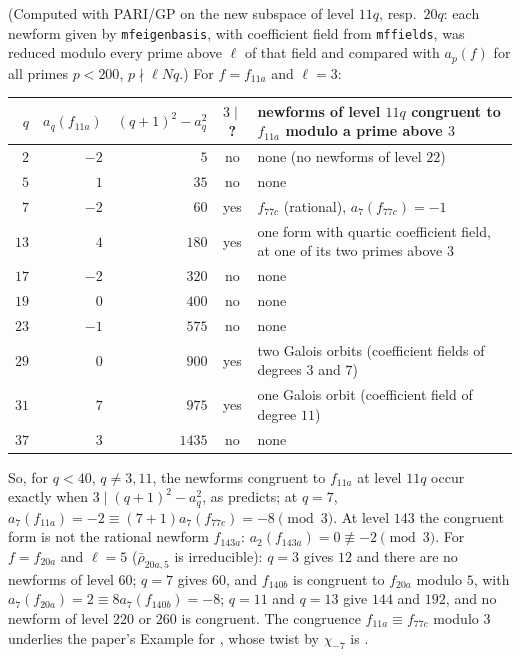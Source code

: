 \begin{example}\label{ex:modgalrep:level-raising}
(Computed with PARI/GP on the new subspace of level $11q$, resp.\ $20q$: each newform given by \texttt{mfeigenbasis}, with coefficient field from
\texttt{mffields}, was reduced modulo every prime above $\ell$ of that field and compared with $a_p(f)$ for all primes $p<200$, $p\nmid\ell Nq$.) For $f=f_{11a}$ and $\ell=3$:
\begin{center}\small
\begin{tabular}{@{}rrrcp{5.9cm}@{}}
\toprule
$q$ & $a_q(f_{11a})$ & $(q+1)^2-a_q^2$ & $3\mid$? & newforms of level $11q$ congruent to $f_{11a}$ modulo a prime above $3$\\
\midrule
$2$ & $-2$ & $5$ & no & none (no newforms of level $22$)\\
$5$ & $1$ & $35$ & no & none\\
$7$ & $-2$ & $60$ & yes & $f_{77c}$ (rational), $a_7(f_{77c})=-1$\\
$13$ & $4$ & $180$ & yes & one form with quartic coefficient field, at one of its two primes above $3$\\
$17$ & $-2$ & $320$ & no & none\\
$19$ & $0$ & $400$ & no & none\\
$23$ & $-1$ & $575$ & no & none\\
$29$ & $0$ & $900$ & yes & two Galois orbits (coefficient fields of degrees $3$ and $7$)\\
$31$ & $7$ & $975$ & yes & one Galois orbit (coefficient field of degree $11$)\\
$37$ & $3$ & $1435$ & no & none\\
\bottomrule
\end{tabular}
\end{center}
So, for $q<40$, $q\ne3,11$, the newforms congruent to $f_{11a}$ at level $11q$ occur exactly when $3\mid(q+1)^2-a_q^2$, as  predicts; at
$q=7$, $a_7(f_{11a})=-2\equiv(7+1)a_7(f_{77c})=-8\pmod3$. At level $143$ the congruent form is not the rational newform $f_{143a}$: $a_2(f_{143a})=0\not\equiv-2\pmod3$. For
$f=f_{20a}$ and $\ell=5$ ($\bar\rho_{20a,5}$ is irreducible): $q=3$ gives $12$ and there are no newforms of level $60$; $q=7$ gives $60$, and $f_{140b}$ is congruent to
$f_{20a}$ modulo $5$, with $a_7(f_{20a})=2\equiv8a_7(f_{140b})=-8$; $q=11$ and $q=13$ give $144$ and $192$, and no newform of level $220$ or $260$ is congruent. The
congruence $f_{11a}\equiv f_{77c}$ modulo $3$ underlies the paper's Example for , whose twist by $\chi_{-7}$ is .
\end{example}


